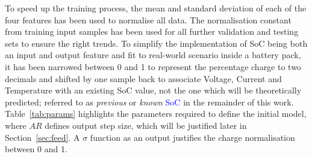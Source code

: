 %
%
{To speed up the training process, the mean and standard deviation of each of the four features has been used to normalise all data.}
The normalisation constant from training input samples has been used for all further validation and testing sets to ensure the right trends.
To simplify the implementation of SoC being both an input and output feature and fit to real-world scenario inside a battery pack, it has been narrowed between 0 and 1 to represent the percentage charge to two decimals and shifted by one sample back to associate Voltage, Current and Temperature with an existing SoC value, not the one which will be theoretically predicted; referred to as \textit{previous} or \textit{known} \textcolor{blue}{SoC} in the remainder of this work.
\mbox{Table~\ref{tab:params}} highlights the parameters required to define the initial model, where $AR$ defines output step size, which will be justified later in Section~\ref{sec:feed}.
A $\sigma$ function as an output justifies the charge normalisation between 0 and 1.
